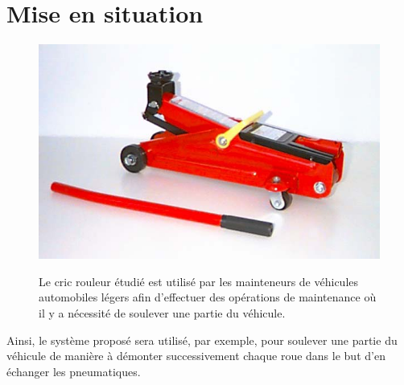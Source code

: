 

\section{Mise en situation}

\begin{figure}[htbp]
\begin{minipage}[c]{.35\linewidth}
\begin{center}
\includegraphics[width=0.8\linewidth]{img/cric-003.png}
\label{fig:image8}
\end{center}
\end{minipage}
\hfill
\begin{minipage}[c]{.6\linewidth}
 
Le cric rouleur étudié est utilisé par les mainteneurs de véhicules automobiles légers afin d'effectuer des opérations de maintenance où il y a nécessité de soulever une partie du véhicule.  

\end{minipage}
\end{figure}

Ainsi, le système proposé sera utilisé, par exemple, pour soulever une partie du véhicule de manière à démonter successivement chaque roue dans le but d'en échanger les pneumatiques.  

